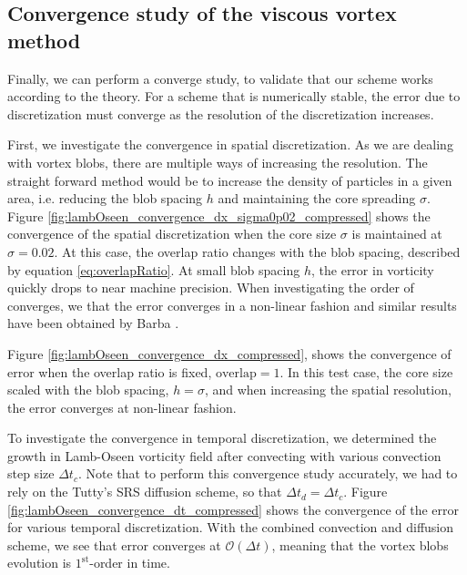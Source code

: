 \subsection{Convergence study of the viscous vortex method}

Finally, we can perform a converge study, to validate that our scheme works according to the theory. For a scheme that is numerically stable, the error due to discretization must converge as the resolution of the discretization increases. 

First, we investigate the convergence in spatial discretization. As we are dealing with vortex blobs, there are multiple ways of increasing the resolution. The straight forward method would be to increase the density of particles in a given area, i.e. reducing the blob spacing $h$ and maintaining the core spreading $\sigma$. Figure \ref{fig:lambOseen_convergence_dx_sigma0p02_compressed} shows the convergence of the spatial discretization when the core size $\sigma$ is maintained at $\sigma=0.02$. At this case, the overlap ratio changes with the blob spacing, described by equation \ref{eq:overlapRatio}. At small blob spacing $h$, the error in vorticity quickly drops to near machine precision. When investigating the order of converges, we that the error converges in a non-linear fashion and similar results have been obtained by Barba \cite{Barba2004c}.

Figure \ref{fig:lambOseen_convergence_dx_compressed}, shows the convergence of error when the overlap ratio is fixed, $\mathrm{overlap} = 1$. In this test case, the core size scaled with the blob spacing, $h=\sigma$, and when increasing the spatial resolution, the error converges at non-linear fashion.
	
To investigate the convergence in temporal discretization, we determined the growth in Lamb-Oseen vorticity field after convecting with various convection step size $\Delta t_c$. Note that to perform this convergence study accurately, we had to rely on the Tutty's SRS diffusion scheme, so that $\Delta t_d = \Delta t_c$. Figure \ref{fig:lambOseen_convergence_dt_compressed} shows the convergence of the error for various temporal discretization. With the combined convection and diffusion scheme, we see that error converges at $\mathcal{O}(\Delta t)$, meaning that the vortex blobs evolution is $1^{\mathrm{st}}$-order in time.

